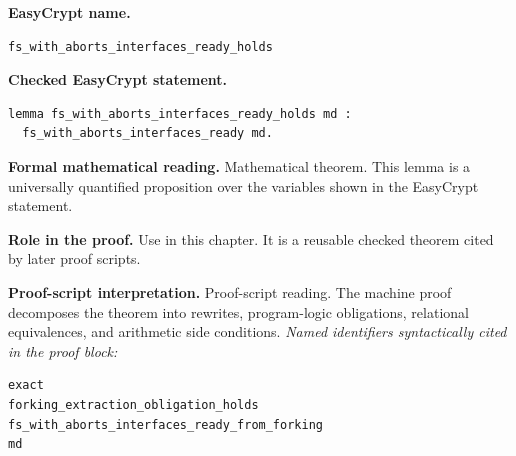 \begin{formaltheorem}
\noindent\textbf{EasyCrypt name.}
\begin{lstlisting}[language=EasyCrypt,basicstyle=\ttfamily\scriptsize]
fs_with_aborts_interfaces_ready_holds
\end{lstlisting}
\noindent\textbf{Checked EasyCrypt statement.}
\begin{lstlisting}[language=EasyCrypt,basicstyle=\ttfamily\scriptsize]
lemma fs_with_aborts_interfaces_ready_holds md :
  fs_with_aborts_interfaces_ready md.
\end{lstlisting}
\noindent\textbf{Formal mathematical reading.}
Mathematical theorem. This lemma is a universally quantified proposition over the variables shown in the EasyCrypt statement.

\noindent\textbf{Role in the proof.}
Use in this chapter. It is a reusable checked theorem cited by later proof scripts.

\noindent\textbf{Proof-script interpretation.}
Proof-script reading. The machine proof decomposes the theorem into rewrites, program-logic obligations, relational equivalences, and arithmetic side conditions.
\emph{Named identifiers syntactically cited in the proof block:}
\begin{lstlisting}[language=EasyCrypt,basicstyle=\ttfamily\scriptsize]
exact
forking_extraction_obligation_holds
fs_with_aborts_interfaces_ready_from_forking
md
\end{lstlisting}

\end{formaltheorem}


